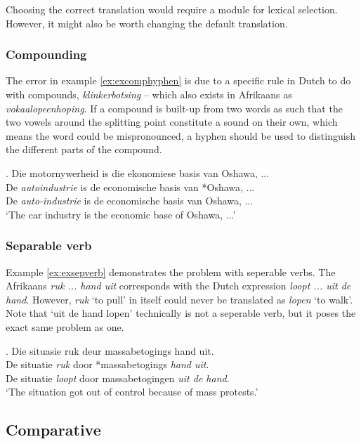 \documentclass[11pt]{article}
\begin{document}
Choosing the correct translation would require a module for lexical selection. However, it might also
be worth changing the default translation.

\subsubsection{Compounding}
The error in example \ref{ex:excomphyphen} is due to a specific rule in Dutch to do with 
compounds, \emph{klinkerbotsing} -- which also exists in Afrikaans 
as \emph{vokaalopeenhoping}. If a compound is built-up from two words as such 
that the two vowels around the splitting point constitute a sound on their own, 
which means the word could be mispronounced, a hyphen should be used to distinguish 
the different parts of the compound. 

\ex. \label{ex:excomphyphen} 
    Die motornywerheid is die ekonomiese basis van Oshawa, ...  \\
    De {\em autoindustrie} is de economische basis van *Oshawa, ... \\
    De {\em auto-industrie} is de economische basis van Oshawa, ... \\
   `The car industry is the economic base of Oshawa, ...'


\subsubsection{Separable verb}

Example \ref{ex:exsepverb} demonstrates the problem with seperable verbs. The 
Afrikaans \emph{ruk ... hand uit} corresponds with the Dutch expression
\emph{loopt ... uit de hand}. However, \emph{ruk} `to pull' in itself 
could never be translated as \emph{lopen} `to walk'. Note that `uit de hand lopen' 
 technically is not a seperable verb, but it poses the exact same problem as one.

\ex. \label{ex:exsepverb} 
    Die situasie ruk deur massabetogings hand uit. \\
    De situatie {\em *ruk} door *massabetogings {\em hand uit}. \\
    De situatie {\em loopt} door massabetogingen {\em uit de hand}. \\
    `The situation got out of control because of mass protests.'



\subsection{Comparative}
\end{document}
